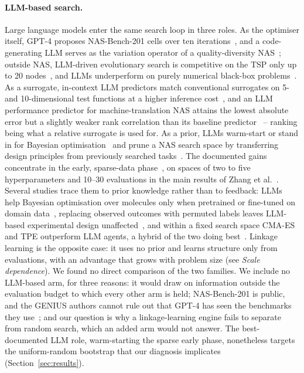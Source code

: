 \paragraph{LLM-based search.} Large language models enter the same search loop in three roles. As the optimiser
itself, GPT-4 proposes NAS-Bench-201 cells over ten iterations~\citep{zheng2023genius}, and a code-generating LLM
serves as the variation operator of a quality-diversity NAS~\citep{nasir2024llmatic}; outside NAS, LLM-driven
evolutionary search is competitive on the TSP only up to 20 nodes~\citep{liu2024lmea}, and LLMs underperform on
purely numerical black-box problems~\citep{huang2024llmblackbox}. As a surrogate, in-context LLM predictors match
conventional surrogates on 5- and 10-dimensional test functions at a higher inference
cost~\citep{hao2024llmsurrogate}, and an LLM performance predictor for machine-translation NAS attains the lowest absolute error but a
slightly weaker rank correlation than its baseline predictor~\citep{jawahar2024llmpp} -- ranking being what a
relative surrogate is used for. As a prior, LLMs warm-start or stand in for Bayesian
optimisation~\citep{liu2024llambo,zhang2024llmhpo} and prune a NAS search space by transferring design principles
from previously searched tasks~\citep{zhou2025lapt}. The documented gains concentrate in the early, sparse-data
phase~\citep{liu2024llambo}, on spaces of two to five hyperparameters and 10--30 evaluations in the main results of
Zhang et al.~\citep{zhang2024llmhpo}. Several studies trace them to prior knowledge rather than to feedback: LLMs
help Bayesian optimisation over molecules only when pretrained or fine-tuned on domain
data~\citep{kristiadi2024sober}, replacing observed outcomes with permuted labels leaves LLM-based experimental
design unaffected~\citep{gupta2025llmbo}, and within a fixed search space CMA-ES and TPE outperform LLM agents, a
hybrid of the two doing best~\citep{ferreira2026centaur}. Linkage learning is the opposite case: it uses no prior
and learns structure only from evaluations, with an advantage that grows with problem size (see
\emph{Scale dependence}). We found no direct comparison of the two families. We include no LLM-based arm, for
three reasons: it would draw on information outside the evaluation budget to which every other arm is held;
NAS-Bench-201 is public, and the GENIUS authors cannot rule out that GPT-4 has seen the benchmarks they
use~\citep{zheng2023genius}; and our question is why a linkage-learning engine fails to separate from random
search, which an added arm would not answer. The best-documented LLM role, warm-starting the sparse early phase,
nonetheless targets the uniform-random bootstrap that our diagnosis implicates (Section~\ref{sec:results}).


